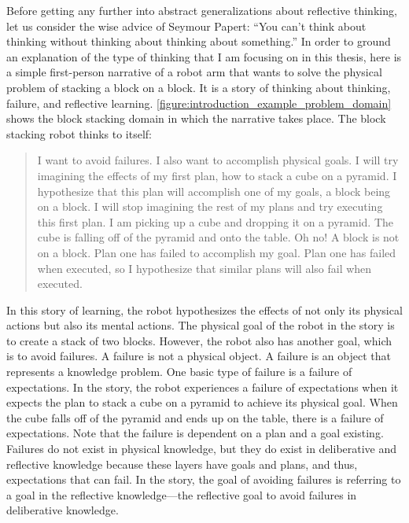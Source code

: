 Before getting any further into abstract generalizations about
reflective thinking, let us consider the wise advice of Seymour
Papert: ``You can't think about thinking without thinking about
thinking about something.''  In order to ground an explanation of the
type of thinking that I am focusing on in this thesis, here is a
simple first-person narrative of a robot arm that wants to solve the
physical problem of stacking a block on a block.  It is a story of
thinking about thinking, failure, and reflective learning.
{\autoref{figure:introduction_example_problem_domain}} shows the block
stacking domain in which the narrative takes place.  The block
stacking robot thinks to itself:
\begin{quote}
  I want to avoid failures.  I also want to accomplish physical goals.
  I will try imagining the effects of my first plan, how to stack a
  cube on a pyramid.  I hypothesize that this plan will accomplish one
  of my goals, a block being on a block.  I will stop imagining the
  rest of my plans and try executing this first plan.  I am picking up
  a cube and dropping it on a pyramid.  The cube is falling off of the
  pyramid and onto the table.  Oh no!  A block is not on a block.
  Plan one has failed to accomplish my goal.  Plan one has failed when
  executed, so I hypothesize that similar plans will also fail when
  executed.
\end{quote}
In this story of learning, the robot hypothesizes the effects of not
only its physical actions but also its mental actions.  The physical
goal of the robot in the story is to create a stack of two blocks.
However, the robot also has another goal, which is to avoid failures.
A failure is not a physical object.  A failure is an object that
represents a knowledge problem.  One basic type of failure is a
failure of expectations.  In the story, the robot experiences a
failure of expectations when it expects the plan to stack a cube on a
pyramid to achieve its physical goal.  When the cube falls off of the
pyramid and ends up on the table, there is a failure of expectations.
Note that the failure is dependent on a plan and a goal existing.
Failures do not exist in physical knowledge, but they do exist in
deliberative and reflective knowledge because these layers have goals
and plans, and thus, expectations that can fail.  In the story, the
goal of avoiding failures is referring to a goal in the reflective
knowledge---the reflective goal to avoid failures in deliberative
knowledge.

